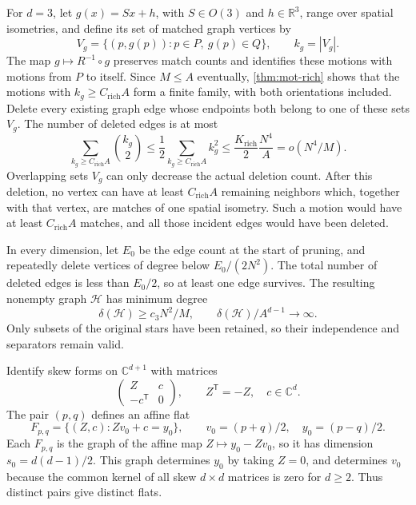 For $d=3$, let $g(x)=Sx+h$, with $S\in O(3)$ and $h\in\mathbb{R}^3$, range over spatial isometries, and define its set of matched graph vertices by
\[
 V_g=\{(p,g(p)):p\in P,\ g(p)\in Q\},\qquad k_g=|V_g|.
\]
The map $g\mapsto R^{-1}\circ g$ preserves match counts and identifies these motions with motions from $P$ to itself. Since $M\le A$ eventually, \cref{thm:mot-rich} shows that the motions with $k_g\ge C_{\mathrm{rich}}A$ form a finite family, with both orientations included. Delete every existing graph edge whose endpoints both belong to one of these sets $V_g$. The number of deleted edges is at most
\[
 \sum_{k_g\ge C_{\mathrm{rich}}A}\binom{k_g}{2}
 \le\frac12\sum_{k_g\ge C_{\mathrm{rich}}A}k_g^2
 \le\frac{K_{\mathrm{rich}}}{2}\frac{N^4}{A}
 =o(N^4/M).
\]
Overlapping sets $V_g$ can only decrease the actual deletion count. After this deletion, no vertex can have at least $C_{\mathrm{rich}}A$ remaining neighbors which, together with that vertex, are matches of one spatial isometry. Such a motion would have at least $C_{\mathrm{rich}}A$ matches, and all those incident edges would have been deleted.

In every dimension, let $E_0$ be the edge count at the start of pruning, and repeatedly delete vertices of degree below $E_0/(2N^2)$. The total number of deleted edges is less than $E_0/2$, so at least one edge survives. The resulting nonempty graph $\mathcal{H}$ has minimum degree
\begin{equation}\label{eq:minimum-degree}
 \delta(\mathcal{H})\ge c_3N^2/M,\qquad
 \delta(\mathcal{H})/A^{d-1}\longrightarrow\infty.
\end{equation}
Only subsets of the original stars have been retained, so their independence and separators remain valid.

Identify skew forms on $\mathbb{C}^{d+1}$ with matrices
\[
 \begin{pmatrix} Z&c\\-c^{\mathsf T}&0\end{pmatrix},
 \qquad Z^{\mathsf T}=-Z,\quad c\in\mathbb{C}^d.
\]
The pair $(p,q)$ defines an affine flat
\begin{equation}\label{eq:pair-flat}
 F_{p,q}=\{(Z,c):Zv_0+c=y_0\},\qquad
 v_0=(p+q)/2,\quad y_0=(p-q)/2 .
\end{equation}
Each $F_{p,q}$ is the graph of the affine map $Z\mapsto y_0-Zv_0$, so it has dimension $s_0=d(d-1)/2$. This graph determines $y_0$ by taking $Z=0$, and determines $v_0$ because the common kernel of all skew $d\times d$ matrices is zero for $d\ge2$. Thus distinct pairs give distinct flats.

